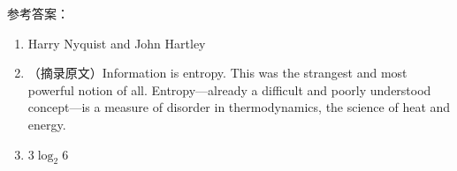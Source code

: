 \documentclass[12pt]{ctexart}
\begin{document}
参考答案：
\begin{enumerate}
  \item Harry Nyquist and John Hartley
  \item （摘录原文）Information is entropy. This was the strangest and most powerful notion of all. Entropy—already a difficult and poorly understood concept—is a measure of disorder in thermodynamics, the science of heat and energy.
  \item $3\log_2 6$
\end{enumerate}
\end{document}
